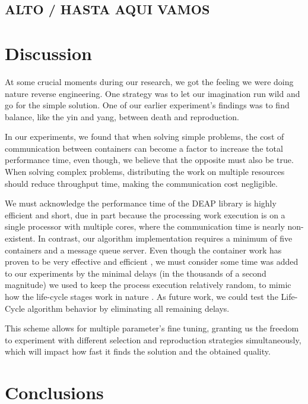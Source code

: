 \documentclass[graybox]{svmult}
\begin{document}
\subsection{ALTO / HASTA AQUI VAMOS}

\section{Discussion}
\label{section.discussion}

At some crucial moments during our research, we got the feeling we were doing
nature reverse engineering. One strategy was to let our imagination run wild
and go for the simple solution. One of our earlier experiment's findings was to
find balance, like the yin and yang, between death and reproduction.

In our experiments, we found that when solving simple problems, the cost of
communication between containers can become a factor to increase the total
performance time, even though, we believe that the opposite must also be true.
When solving complex problems, distributing the work on multiple resources
should reduce throughput time, making the communication cost negligible.

We must acknowledge the performance time of the DEAP library
\cite{fortin2012deap} is highly efficient and short, due in part because the
processing work execution is on a single processor with multiple cores, where
the communication time is nearly non-existent. In contrast, our algorithm
implementation requires a minimum of five containers and a message queue
server. Even though the container work has proven to be very effective and
efficient \cite{merelo2016performance,valdez2021container}, we must consider
some time was added to our experiments by the minimal delays (in the thousands
of a second magnitude) we used to keep the process execution relatively random,
to mimic how the life-cycle stages work in nature \cite{read1968system}. As
future work, we could test the Life-Cycle algorithm behavior by eliminating all
remaining delays.

This scheme allows for multiple parameter's fine tuning, granting us the
freedom to experiment with different selection and reproduction strategies
simultaneously, which will impact how fast it finds the solution and the
obtained quality.


\section{Conclusions}
\label{section.conclusions}
\end{document}
